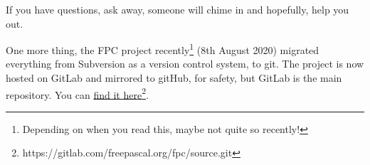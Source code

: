 If you have questions, ask away, someone will chime in and hopefully,
help you out.

One more thing, the FPC project recently\footnote{Depending on when you read this, maybe not quite so recently!}
(8th August 2020) migrated everything from Subversion as a version
control system, to git. The project is now hosted on GitLab and mirrored
to gitHub, for safety, but GitLab is the main repository. You can
\href{https://gitlab.com/freepascal.org/fpc/source.git}{find it here}\footnote{https://gitlab.com/freepascal.org/fpc/source.git}.

